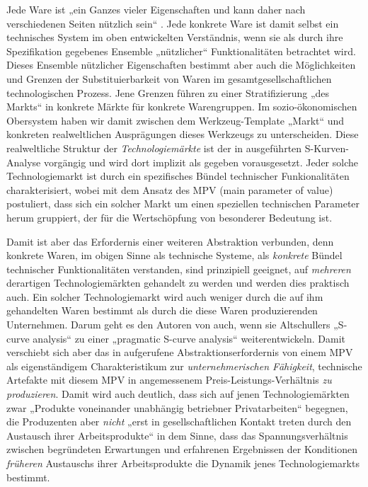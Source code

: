 \documentclass[11pt,a4paper]{article}
\begin{document}
Jede Ware ist „ein Ganzes vieler Eigenschaften und kann daher nach
verschiedenen Seiten nützlich sein“ \cite[S. 49]{MEW23}. Jede konkrete Ware
ist damit selbst ein technisches System im oben entwickelten Verständnis, wenn
sie als durch ihre Spezifikation gegebenes Ensemble „nützlicher“
Funktionalitäten betrachtet wird. Dieses Ensemble nützlicher Eigenschaften
bestimmt aber auch die Möglichkeiten und Grenzen der Substituierbarkeit von
Waren im gesamtgesellschaftlichen technologischen Prozess. Jene Grenzen führen
zu einer Stratifizierung „des Markts“ in konkrete Märkte für konkrete
Warengruppen. Im sozio-ökonomischen Obersystem haben wir damit zwischen dem
Werkzeug-Template „Markt“ und konkreten realweltlichen Ausprägungen dieses
Werkzeugs zu unterscheiden. Diese realweltliche Struktur der
\emph{Technologiemärkte} ist der in \cite{TESE2018} ausgeführten
S-Kurven-Analyse vorgängig und wird dort implizit als gegeben vorausgesetzt.
Jeder solche Technologiemarkt ist durch ein spezifisches Bündel technischer
Funkionalitäten charakterisiert, wobei \cite{TESE2018} mit dem Ansatz des MPV
(main parameter of value) postuliert, dass sich ein solcher Markt um einen
speziellen technischen Parameter herum gruppiert, der für die Wertschöpfung
von besonderer Bedeutung ist.

Damit ist aber das Erfordernis einer weiteren Abstraktion verbunden, denn
konkrete Waren, im obigen Sinne als technische Systeme, als \emph{konkrete}
Bündel technischer Funktionalitäten verstanden, sind prinzipiell geeignet, auf
\emph{mehreren} derartigen Technologiemärkten gehandelt zu werden und werden
dies praktisch auch. Ein solcher Technologiemarkt wird auch weniger durch die
auf ihm gehandelten Waren bestimmt als durch die diese Waren produzierenden
Unternehmen. Darum geht es den Autoren von \cite{TESE2018} auch, wenn sie
Altschullers „S-curve analysis“ zu einer „pragmatic S-curve analysis“
weiterentwickeln.  Damit verschiebt sich aber das in \cite{TESE2018}
aufgerufene Abstraktionserfordernis von einem MPV als eigenständigem
Charakteristikum zur \emph{unternehmerischen Fähigkeit}, technische Artefakte
mit diesem MPV in angemessenem Preis-Leistungs-Verhältnis \emph{zu
  produzieren}.  Damit wird auch deutlich, dass sich auf jenen
Technologiemärkten zwar „Produkte voneinander unabhängig betriebner
Privatarbeiten“ begegnen, die Produzenten aber \emph{nicht} „erst in
gesellschaftlichen Kontakt treten durch den Austausch ihrer Arbeitsprodukte“
\cite[S. 87]{MEW23} in dem Sinne, dass das Spannungsverhältnis zwischen
begründeten Erwartungen und erfahrenen Ergebnissen der Konditionen
\emph{früheren} Austauschs ihrer Arbeitsprodukte die Dynamik jenes
Technologiemarkts bestimmt.  
\end{document}
